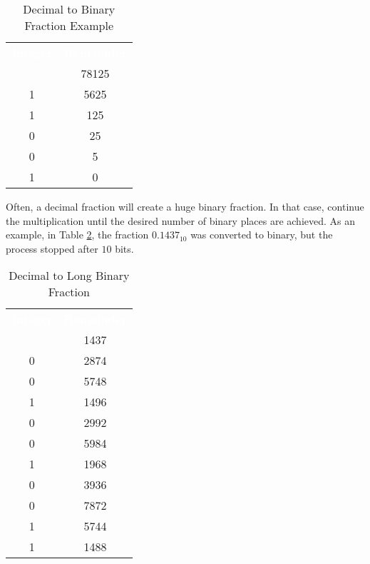 \begin{table}[H]
  \sffamily
  \newcommand{\head}[1]{\textcolor{white}{\textbf{#1}}}    
  \begin{center}
    \begin{tabular}[htb]{ c c } 
      \hline
      \rowcolor{black!75}
      \head{Integer} & \head{Remainder} \\
        & 78125 \\
      1 & 5625 \\
      1 & 125 \\
      0 & 25 \\
      0 & 5 \\
      1 & 0 \\ \hline
    \end{tabular}
  \end{center}
  \caption{Decimal to Binary Fraction Example}
  \label{MF:tab:dec_to_bin_fraction_example_2}
\end{table}

Often, a decimal fraction will create a huge binary fraction. In that case, continue the multiplication until the desired number of binary places are achieved. As an example, in Table \ref{MF:tab:dec_to_bin_long_fraction}, the fraction $ 0.1437_{10} $ was converted to binary, but the process stopped after $ 10 $ bits.

\begin{table}[H]
  \sffamily
  \newcommand{\head}[1]{\textcolor{white}{\textbf{#1}}}    
  \begin{center}
    \begin{tabular}{ c c } 
      \hline
      \rowcolor{black!75}
      \head{Integer} & \head{Remainder} \\
      & 1437 \\
      0 & 2874 \\
      0 & 5748 \\
      1 & 1496 \\
      0 & 2992 \\
      0 & 5984 \\
      1 & 1968 \\
      0 & 3936 \\
      0 & 7872 \\
      1 & 5744 \\
      1 & 1488 \\ \hline
    \end{tabular}
  \end{center}
  \caption{Decimal to Long Binary Fraction}
  \label{MF:tab:dec_to_bin_long_fraction}
\end{table}

